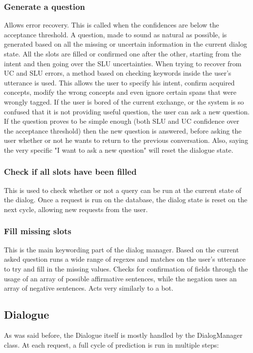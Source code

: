 \documentclass[11pt,a4paper]{article}
\begin{document}
\subsubsection{Generate a question}
Allows error recovery. This is called when the confidences are below the acceptance threshold. A question, made to sound as natural as possible, is generated based on all the missing or uncertain information in the current dialog state. All the slots are filled or confirmed one after the other, starting from the intent and then going over the SLU uncertainties. When trying to recover from UC and SLU errors, a method based on checking keywords inside the user's utterance is used. This allows the user to specify his intent, confirm acquired concepts, modify the wrong concepts and even ignore certain spans that were wrongly tagged. If the user is bored of the current exchange, or the system is so confused that it is not providing useful question, the user can ask a new question. If the question proves to be simple enough (both SLU and UC confidence over the acceptance threshold) then the new question is answered, before asking the user whether or not he wants to return to the previous conversation. Also, saying the very specific "I want to ask a new question" will reset the dialogue state.

\subsubsection{Check if all slots have been filled}
This is used to check whether or not a query can be run at the current state of the dialog. Once a request is run on the database, the dialog state is reset on the next cycle, allowing new requests from the user.

\subsubsection{Fill missing slots}
This is the main keywording part of the dialog manager. Based on the current asked question runs a wide range of regexes and matches on the user's utterance to try and fill in the missing values. Checks for confirmation of fields through the usage of an array of possible affirmative sentences, while the negation uses an array of negative sentences. Acts very similarly to a bot.

\subsection{Dialogue}
As was said before, the Dialogue itself is mostly handled by the DialogManager class.
At each request, a full cycle of prediction is run in multiple steps:
\end{document}
